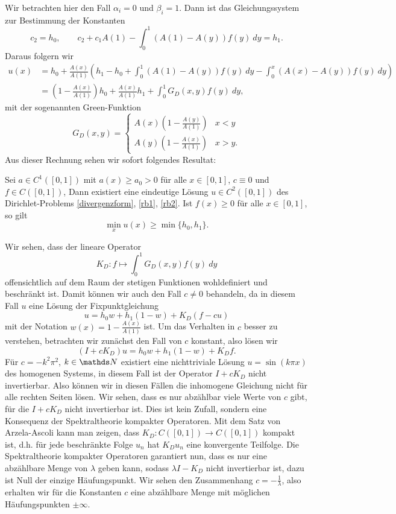 Wir betrachten hier den Fall $\alpha_i=0$ und $\beta_i=1$. Dann ist das Gleichungssystem zur Bestimmung der Konstanten 
$$c_2 = h_0, \qquad c_2 + c_1 A(1)   - \int_0^1 (A(1) - A(y)) f(y)~dy = h_1. $$  
Daraus folgern wir
\begin{align*}
	u(x) &= h_0 + \frac{A(x)}{A(1)} \left( h_1 - h_0 + \int_0^1 (A(1) - A(y)) f(y)~dy - \int_0^x (A(x) - A(y)) f(y)~dy \right)\\
	&= \left( 1- \frac{A(x)}{A(1)} \right) h_0 +  \frac{A(x)}{A(1)} h_1  + \int_0^1 G_D(x,y) f(y) ~dy, 
\end{align*}
mit der sogenannten Green-Funktion 
$$ G_D(x,y) =  \left\{ \begin{array}{ll}  A(x)  ( 1- \frac{A(y)}{A(1)}) & x < y \\
A(y) ( 1-  \frac{A(x)}{A(1)}) & x > y . \end{array}\right.$$
Aus dieser Rechnung sehen wir sofort folgendes Resultat:
\begin{theorem}{}{}
Sei $a \in C^1([0,1])$ mit $a(x) \geq a_0 > 0$ f\"ur alle $x \in [0,1]$, $c \equiv 0$ und $f \in C([0,1])$, Dann existiert eine eindeutige L\"osung $u \in C^2([0,1])$ des Dirichlet-Problems \eqref{divergenzform}, \eqref{rb1}, \eqref{rb2}. Ist $f(x) \geq 0$ f\"ur alle $x \in [0,1]$, so gilt
$$ \min_x u(x) \geq \min\{h_0,h_1\}. $$
\end{theorem}

Wir sehen, dass der lineare Operator 
$$ K_D: f \mapsto \int_0^1 G_D(x,y) f(y)~dy$$
offensichtlich auf dem Raum der stetigen Funktionen wohldefiniert und beschr\"ankt ist. Damit k\"onnen wir auch den Fall $c \neq 0$ behandeln, da in diesem Fall $u$ eine L\"osung der Fixpunktgleichung
$$ u = h_0 w + h_1 (1-w) + K_D ( f- cu)
$$
mit der Notation $w(x) =  1- \frac{A(x)}{A(1)}$ ist.
Um das Verhalten in $c$ besser zu verstehen, betrachten wir zun\"achst den Fall von $c$ konstant, also l\"osen wir
$$ (I+cK_D) u = h_0 w + h_1 (1-w) + K_D  f. $$
F\"ur $c = -k^2 \pi^2$, $k \in \N$ existiert eine nichttriviale L\"osung $u = \sin(k \pi x)$ des homogenen Systems, in diesem Fall ist der Operator $I+cK_D$ nicht invertierbar.  Also k\"onnen wir in diesen F\"allen die inhomogene Gleichung nicht f\"ur alle rechten Seiten l\"osen. Wir sehen, dass es nur abz\"ahlbar viele Werte von $c$ gibt, f\"ur die $I+cK_D$ nicht invertierbar ist. Dies ist kein Zufall, sondern eine Konsequenz der Spektraltheorie kompakter Operatoren. Mit dem Satz von Arzela-Ascoli kann man zeigen, dass $K_D: C([0,1]) \rightarrow C([0,1])$ kompakt ist, d.h. f\"ur jede beschr\"ankte Folge $u_n$ hat $K_D u_n$ eine konvergente Teilfolge. Die Spektraltheorie kompakter Operatoren garantiert nun, dass es nur eine abz\"ahlbare Menge von $\lambda$ geben kann, sodass $\lambda I - K_D$ nicht invertierbar ist, dazu ist Null der einzige H\"aufungspunkt. Wir sehen den Zusammenhang $c= - \frac{1}\lambda$, also erhalten wir f\"ur die Konstanten $c$ eine abz\"ahlbare Menge mit m\"oglichen H\"aufungspunkten $\pm \infty.$

